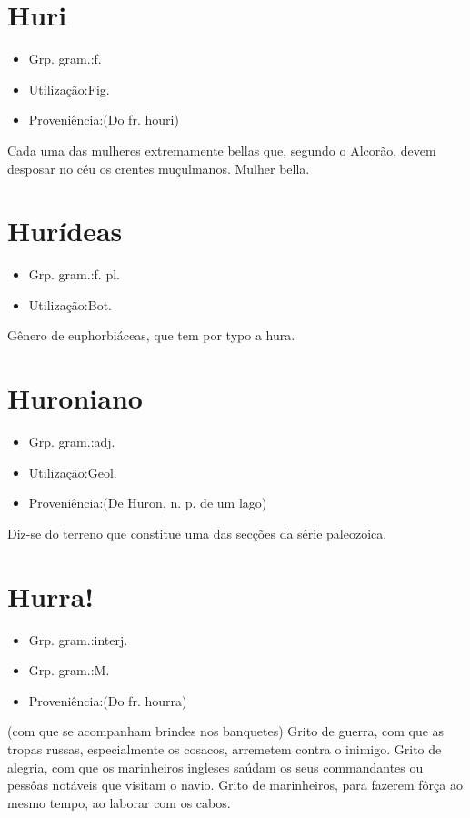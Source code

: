 \documentclass{article}
\begin{document}
\section{Huri}
\begin{itemize}
\item {Grp. gram.:f.}
\end{itemize}
\begin{itemize}
\item {Utilização:Fig.}
\end{itemize}
\begin{itemize}
\item {Proveniência:(Do fr. \textunderscore houri\textunderscore )}
\end{itemize}
Cada uma das mulheres extremamente bellas que, segundo o \textunderscore Alcorão\textunderscore , devem desposar no céu os crentes muçulmanos.
Mulher bella.
\section{Hurídeas}
\begin{itemize}
\item {Grp. gram.:f. pl.}
\end{itemize}
\begin{itemize}
\item {Utilização:Bot.}
\end{itemize}
Gênero de euphorbiáceas, que tem por typo a hura.
\section{Huroniano}
\begin{itemize}
\item {Grp. gram.:adj.}
\end{itemize}
\begin{itemize}
\item {Utilização:Geol.}
\end{itemize}
\begin{itemize}
\item {Proveniência:(De \textunderscore Huron\textunderscore , n. p. de um lago)}
\end{itemize}
Diz-se do terreno que constitue uma das secções da série paleozoica.
\section{Hurra!}
\begin{itemize}
\item {Grp. gram.:interj.}
\end{itemize}
\begin{itemize}
\item {Grp. gram.:M.}
\end{itemize}
\begin{itemize}
\item {Proveniência:(Do fr. \textunderscore hourra\textunderscore )}
\end{itemize}
(com que se acompanham brindes nos banquetes)
Grito de guerra, com que as tropas russas, especialmente os cosacos, arremetem contra o inimigo.
Grito de alegria, com que os marinheiros ingleses saúdam os seus commandantes ou pessôas notáveis que visitam o navio.
Grito de marinheiros, para fazerem fôrça ao mesmo tempo, ao laborar com os cabos.
\end{document}
